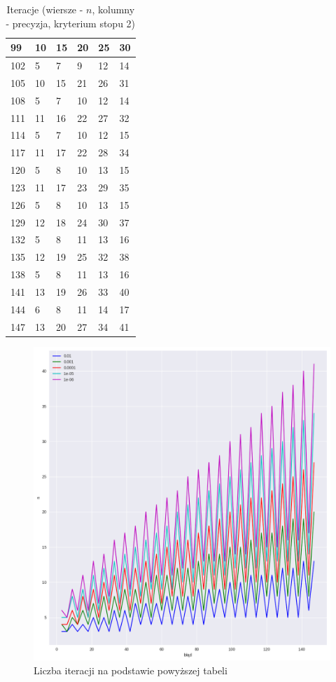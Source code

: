 \documentclass{article}
\begin{document}
\begin{table}[H]
\begin{tabular}{|l|l|l|l|l|l|}
99 & 10 & 15 & 20 & 25 & 30 \\ \hline
102 & 5 & 7 & 9 & 12 & 14 \\ \hline
105 & 10 & 15 & 21 & 26 & 31 \\ \hline
108 & 5 & 7 & 10 & 12 & 14 \\ \hline
111 & 11 & 16 & 22 & 27 & 32 \\ \hline
114 & 5 & 7 & 10 & 12 & 15 \\ \hline
117 & 11 & 17 & 22 & 28 & 34 \\ \hline
120 & 5 & 8 & 10 & 13 & 15 \\ \hline
123 & 11 & 17 & 23 & 29 & 35 \\ \hline
126 & 5 & 8 & 10 & 13 & 15 \\ \hline
129 & 12 & 18 & 24 & 30 & 37 \\ \hline
132 & 5 & 8 & 11 & 13 & 16 \\ \hline
135 & 12 & 19 & 25 & 32 & 38 \\ \hline
138 & 5 & 8 & 11 & 13 & 16 \\ \hline
141 & 13 & 19 & 26 & 33 & 40 \\ \hline
144 & 6 & 8 & 11 & 14 & 17 \\ \hline
147 & 13 & 20 & 27 & 34 & 41 \\ \hline
\end{tabular}
\caption{Iteracje (wiersze - $n$, kolumny - precyzja, kryterium stopu 2)}
\end{table}

\begin{figure}[H]
    \centering
    \includegraphics[width=\textwidth]{img/plot_4.png}
    \caption{Liczba iteracji na podstawie powyższej tabeli}
\end{figure}
\end{document}
